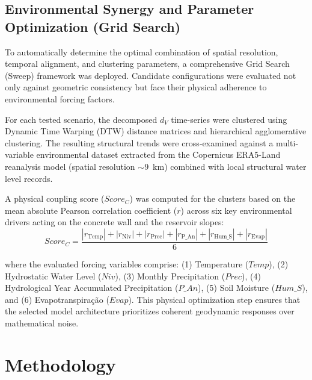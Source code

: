 \documentclass[11pt,a4paper]{article}
\begin{document}
\subsection{Environmental Synergy and Parameter Optimization (Grid Search)}

To automatically determine the optimal combination of spatial resolution, temporal alignment, and clustering parameters, a comprehensive Grid Search (Sweep) framework was deployed. Candidate configurations were evaluated not only against geometric consistency but face their physical adherence to environmental forcing factors. 

For each tested scenario, the decomposed $d_V$ time-series were clustered using Dynamic Time Warping (DTW) distance matrices and hierarchical agglomerative clustering. The resulting structural trends were cross-examined against a multi-variable environmental dataset extracted from the Copernicus ERA5-Land reanalysis model (spatial resolution $\sim$9~km) combined with local structural water level records. 

A physical coupling score ($Score_C$) was computed for the clusters based on the mean absolute Pearson correlation coefficient ($r$) across six key environmental drivers acting on the concrete wall and the reservoir slopes:
\begin{equation}
    Score_C = \frac{|r_{\text{Temp}}| + |r_{\text{Niv}}| + |r_{\text{Prec}}| + |r_{\text{P\_An}}| + |r_{\text{Hum\_S}}| + |r_{\text{Evap}}|}{6}
\end{equation}

where the evaluated forcing variables comprise: (1) Temperature ($Temp$), (2) Hydrostatic Water Level ($Niv$), (3) Monthly Precipitation ($Prec$), (4) Hydrological Year Accumulated Precipitation ($P\_An$), (5) Soil Moisture ($Hum\_S$), and (6) Evapotranspiração ($Evap$). This physical optimization step ensures that the selected model architecture prioritizes coherent geodynamic responses over mathematical noise.


\section{Methodology}

\end{document}
